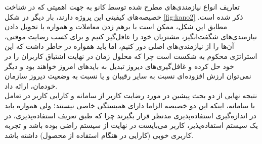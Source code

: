 تعاریف انواع نیازمندی‌های مطرح شده توسط کانو به جهت اهمیتی که در شناخت خصیصه‌های کیفیتی این پروژه دارند، بار دیگر در شکل
\ref{fig:kano2}
ذکر شده است. مطابق این شکل، ممکن است با برهم زدن معاملات و همواره با تحویل دادن نیاز‌مندی‌های شگفت‌انگیز، مشتریان خود را غافل‌گیر کنیم و برای کسب رضایت موقتی، آن‌ها را از نیازمندی‌های اصلی دور کنیم، اما باید همواره در خاطر داشت که این استراتژی محکوم به شکست است چرا که محلول زمان در نهایت اشتیاق کاربران را در خود حل کرده و غافل‌گیری‌های دیروز تبدیل به باید‌های امروز خواهند بود و دیگر نمی‌توان ارزش افزوده‌ای نسبت به سایر رقیبان و یا نسبت به وضعیت دیروز سازمان خودمان، ارائه داد.\\
نتیجه نهایی از دو بحث پیشین در مورد رضایت کاربر از سامانه و کارایی کاربر در تعامل با سامانه، اینکه این دو خصیصه الزاما دارای همبستگی خاصی نیستند؛ ولی همواره باید در اندازه‌گیری استفاده‌پذیری مدنظر قرار بگیرند چرا که طبق تعریف استفاده‌پذیری، در یک سیستم استفاده‌پذیر، کاربر می‌بایست در نهایت از سیستم راضی بوده باشد و تجربه کاربری خوبی (کارایی در هنگام استفاده از محصول) داشته باشد.
